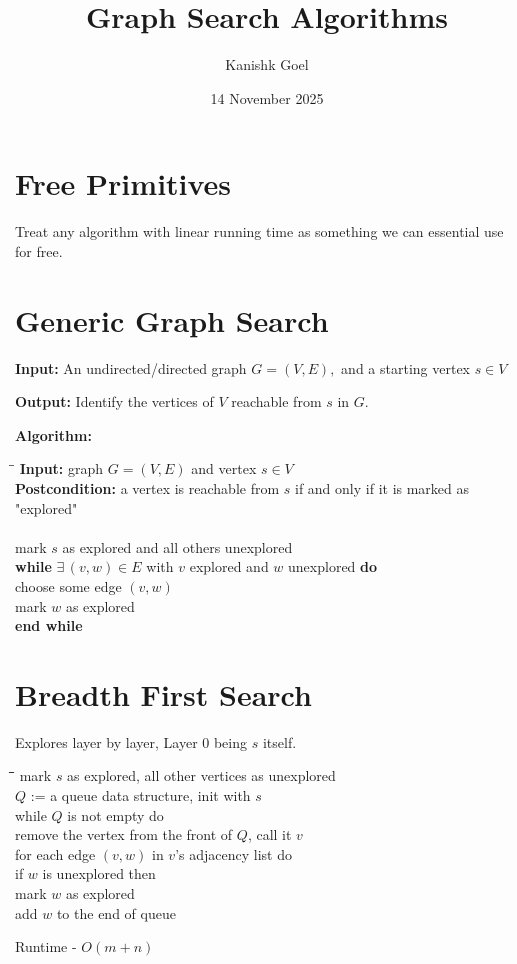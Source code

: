 \documentclass{article}
\title{Graph Search Algorithms}
\author{Kanishk Goel}
\date{14 November 2025}
\begin{document}
	\maketitle
	\section{Free Primitives}
	Treat any algorithm with linear running time as something we can essential use for free.
	\section{Generic Graph Search}
	\textbf{Input:}
	An undirected/directed graph $G = (V,E),$ and a starting vertex $s \in V$
	
	\textbf{Output:} Identify the vertices of $V$ reachable from $s$ in $G$. \\
	\begin{center}
		\begin{large}
			\textbf{Algorithm:} \\
		\end{large}
	\end{center}
	\begin{tabbing}
		\qquad \= \qquad \= \kill
		\textbf{Input:} graph $G = (V,E)$ and vertex $s \in V$ \\
		\textbf{Postcondition:} a vertex is reachable from $s$ if and only if it is marked as "explored" \\\\
		mark $s$ as explored and all others unexplored \\
		\textbf{while} $\exists\,(v,w)\in E$ with $v$ explored and $w$ unexplored \textbf{do} \\
		\> choose some edge $(v,w)$ \\
		\> mark $w$ as explored \\
		\textbf{end while}
	\end{tabbing}
	\section{Breadth First Search} 
	Explores layer by layer, Layer $0$ being $s$ itself.
	\begin{tabbing}
		\qquad \= \qquad \= \qquad \= \qquad \= \kill
		mark $s$ as explored, all other vertices as unexplored \\
		$Q$ := a queue data structure, init with $s$ \\
		while $Q$ is not empty do \\
		\> remove the vertex from the front of $Q$, call it $v$ \\
		\> for each edge $(v,w)$ in $v$'s adjacency list do \\
		\> \> if $w$ is unexplored then \\
		\> \> \> mark $w$ as explored \\
		\> \> \> add $w$ to the end of queue
	\end{tabbing} Runtime - $O(m+n)$
	
\end{document}
